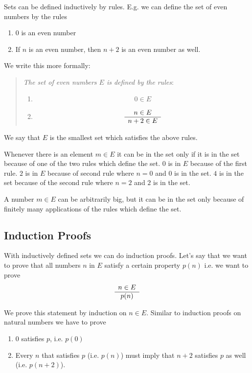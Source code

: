 Sets can be defined inductively by rules. E.g. we can define the set of even
numbers by the rules

\begin{enumerate}
\item $0$ is an even number

\item If $n$ is an even number, then $n+2$ is an even number as well.
\end{enumerate}

We write this more formally:

\begin{quote}

\emph{The set of even numbers $E$ is defined by the rules}:
    \begin{enumerate}
    \item $$ 0 \in E$$

    \item
        $$
        \begin{array}{c} n \in E \\ \hline n+2 \in E\end{array}
        $$
    \end{enumerate}
\end{quote}

We say that $E$ is the smallest set which satisfies the above rules.

Whenever there is an element $m \in E$ it can be in the set only if it is in the
set because of one of the two rules which define the set. $0$ is in $E$ because
of the first rule. $2$ is in $E$ because of second rule where $n = 0$ and $0$ is
in the set. $4$ is in the set because of the second rule where $n = 2$ and $2$
is in the set.

A number $m \in E$ can be arbitrarily big, but it can be in the set only because
of finitely many applications of the rules which define the set.




\subsection{Induction Proofs}

With inductively defined sets we can do induction proofs. Let's say that we want
to prove that all numbers $n$ in $E$ satisfy a certain property $p(n)$ i.e. we
want to prove
$$
\begin{array}{c} n \in E \\ \hline p(n)\end{array}
$$

We prove this statement by induction on $n \in E$. Similar to induction proofs
on natural numbers we have to prove

\begin{enumerate}
\item $0$ satisfies $p$, i.e. $p(0)$

\item Every $n$ that satisfies $p$ (i.e. $p(n)$) must imply that $n+2$ satisfies
$p$ as well (i.e. $p(n+2)$).

\end{enumerate}

